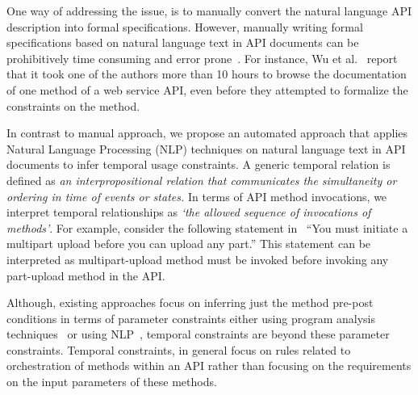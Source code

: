One way of addressing the issue, is to manually convert the natural language API description into formal specifications. 
However, manually writing formal specifications based on natural language text in API documents can be prohibitively time consuming and error prone~\cite{wu2013inferring,RubingerWEB10}. 
For instance, Wu et al.~\cite{wu2013inferring} report that it took one of the authors more than 10 hours to browse the documentation of one method of a web service API, even before they attempted to formalize the constraints on the method.

In contrast to manual approach, we propose an automated approach that applies Natural Language Processing (NLP) techniques on natural language text in API documents to infer temporal usage constraints. 
A generic temporal relation is defined as \textit{an interpropositional relation that communicates the simultaneity or ordering in time of events or states.}
In terms of API method invocations, we interpret temporal relationships as \textit{`the allowed sequence of invocations of methods'}.
For example, consider the following statement in \amazonAPI\ ``You must initiate a multipart upload before you can upload any part.''
This statement can be interpreted as multipart-upload method must be invoked before invoking any part-upload method in the API.




Although, existing approaches focus on inferring just the method pre-post conditions in terms of parameter constraints either using program analysis techniques~\cite{Henkel07discoveringdocumentation,Ghezzi:2009:SIB:1555001.1555057,Henkel:2008:DDA:1363102.1363105,Flanagan2001:HAA,Buse:2008:ADI:1390630.1390664} or using NLP~\cite{pandita12:inferring, wu2013inferring}, temporal constraints are beyond these parameter constraints.
Temporal constraints, in general focus on rules related to orchestration of methods within an API rather than focusing on the requirements on the input parameters of these methods.

